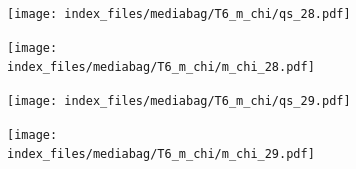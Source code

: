 \documentclass[
  11pt,
  letterpaper,
]{scrreprt}
\begin{document}
\begin{figure}

\begin{minipage}{0.50\linewidth}

\begin{figure}[H]

{\centering \texttt{[image: index\_files/mediabag/T6\_m\_chi/qs\_28.pdf]}

}


\end{figure}%

\end{minipage}%
%
\begin{minipage}{0.50\linewidth}

\begin{figure}[H]

{\centering \texttt{[image: index\_files/mediabag/T6\_m\_chi/m\_chi\_28.pdf]}

}


\end{figure}%

\end{minipage}%

\end{figure}%

\begin{figure}

\begin{minipage}{0.50\linewidth}

\begin{figure}[H]

{\centering \texttt{[image: index\_files/mediabag/T6\_m\_chi/qs\_29.pdf]}

}


\end{figure}%

\end{minipage}%
%
\begin{minipage}{0.50\linewidth}

\begin{figure}[H]

{\centering \texttt{[image: index\_files/mediabag/T6\_m\_chi/m\_chi\_29.pdf]}

}


\end{figure}%

\end{minipage}%

\end{figure}%
\end{document}
